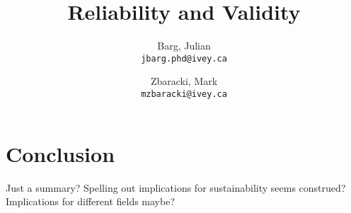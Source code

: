 \documentclass{article}
\title{Reliability and Validity}
\author{
	Barg, Julian\\
	\texttt{jbarg.phd@ivey.ca}
	\and
	Zbaracki, Mark\\
	\texttt{mzbaracki@ivey.ca}
}
\begin{document}
	\maketitle

	

	

	

	

	

	







	\section*{Conclusion}

	Just a summary? Spelling out implications for sustainability seems construed? Implications for different fields maybe?

	\clearpage
	
	
\end{document}
